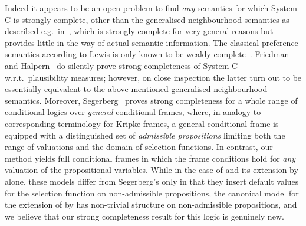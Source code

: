 \documentclass[proceedings]{stacs}
\theoremstyle{definition}
\theoremstyle{plain}
\begin{document}
\begin{exa}
  Indeed it appears to be an open problem to find \emph{any} semantics
  for which System C is strongly complete, other than the generalised
  neighbourhood semantics as described e.g.\
  in~\cite{SchroderPattinson07mcs}, which is strongly complete for
  very general reasons but provides little in the way of actual
  semantic information. The classical preference semantics according
  to Lewis is only known to be weakly
  complete~\cite{Burgess81}. Friedman and
  Halpern~\cite{FriedmanHalpern01} do silently prove strong
  completeness of System C w.r.t.\ plausibility measures; however, on
  close inspection the latter turn out to be essentially equivalent to
  the above-mentioned generalised neighbourhood semantics. Moreover,
  Segerberg~\cite{Segerberg89} proves strong completeness for a whole
  range of conditional logics over \emph{general} conditional frames,
  where, in analogy to corresponding terminology for Kripke frames, a
  general conditional frame is equipped with a distinguished set of
  \emph{admissible propositions} limiting both the range of valuations
  and the domain of selection functions. In contrast, our method
  yields full conditional frames in which the frame conditions hold
  for \emph{any} valuation of the propositional variables. While in
  the case of  and its extension by  alone, these models
  differ from Segerberg's only in that they insert default values for
  the selection function on non-admissible propositions, the
  canonical model for the extension of  by 
  has non-trivial structure on non-admissible propositions, and we
  believe that our strong completeness result for this logic is
  genuinely new.
\end{exa}
\end{document}

